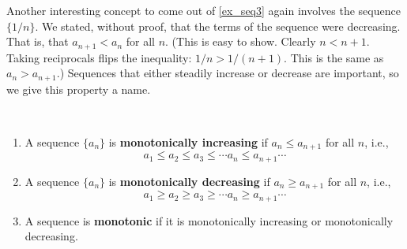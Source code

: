 Another interesting concept to come out of \autoref{ex_seq3} again involves the sequence $\{1/n\}$. We stated, without proof, that the terms of the sequence were decreasing. That is, that $a_{n+1} < a_n$ for all $n$. (This is easy to show. Clearly $n < n+1$. Taking reciprocals flips the inequality: $1/n > 1/(n+1)$. This is the same as $a_n > a_{n+1}$.) Sequences that either steadily increase or decrease are important, so we give this property a name.

{\mbox{}\\[-2\baselineskip]\begin{enumerate}
\item		A sequence $\{a_n\}$ is \textbf{monotonically increasing} if $a_n \leq a_{n+1}$ for all $n$, i.e.,
 $$a_1 \leq a_2 \leq a_3 \leq \cdots a_n \leq a_{n+1} \cdots$$
 \item	A sequence $\{a_n\}$ is \textbf{monotonically decreasing} if $a_n \geq a_{n+1}$ for all $n$, i.e.,
 $$a_1 \geq a_2 \geq a_3 \geq \cdots a_n \geq a_{n+1} \cdots$$
 \item	A sequence is \textbf{monotonic} if it is monotonically increasing or monotonically decreasing.
 \end{enumerate}}


